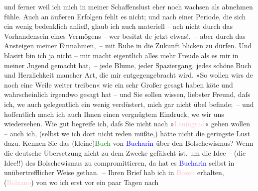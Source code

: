                und ferner weil ich mich in meiner Schaffenslust eher noch wachsen als abnehmen
               fühle. Auch an äußeren Erfolgen fehlt es nicht; und nach einer Periode, die sich ein
               wenig bedenklich anließ, glaub ich auch materiell – ach nicht durch das Vorhandensein
               eines Vermögens – wer besitzt de{\geminationn} jetzt etwas!, – aber
               durch das Ansteigen meiner Einnahmen, – mit Ruhe in die Zukunft blicken zu dürfen.
               Und blasirt bin ich ja nicht – mir macht eigentlich alles mehr Freude als es mir in
               meiner Jugend gemacht hat, – jede Blume, jeder Spaziergang, jedes schöne Buch und
               Herzlichkeit mancher Art, die mir entgegengebracht wird. »So wollen wirs de{\geminationn} noch eine Weile weiter treiben« wie ein sehr Großer
               gesagt haben kö{\geminationn}te und wahrscheinlich irgendwo gesagt
               hat – und Sie sollen wissen, liebster Freund, daſs ich, we{\geminationn} auch gelegentlich ein wenig verdüstert, {\pb}mich gar nicht übel befinde; – und hoffentlich
               mach ich auch Ihnen einen vergnügtem Eindruck, we{\geminationn} wir
               uns wiedersehen.\pend
           \pstart
           Wie gut begreife ich, daſs Sie nicht nach »\textcolor{pink}{Leningrad}{}\ledrightnote{\textcolor{pink}{Sankt Petersburg}}« gehen wollen – auch ich, (selbst we{\geminationn}
               ich dort nicht reden müßte,) hätte nicht die geringste Lust dazu. Kennen Sie das \introOben{}(kleine)\introOben{}{ }\textcolor{green}{Buch}{} von \textcolor{blue}{Bucharin}{}\ledrightnote{\textcolor{blue}{Nikolaj Ivanovič Bucharin}} über den Bolschewismus? Wenn die deutsche Übersetzung
               nicht \label{T_L02444_2v}\label{T_L02444_2h} zu dem Zwecke gefälscht ist, um die Idee – (die
               Idee!!) des Bolschewismus zu compromittieren, da{\geminationn} hat es
                  \textcolor{blue}{Bucharin}{}\ledrightnote{\textcolor{blue}{Nikolaj Ivanovič Bucharin}} selbst in unübertrefflicher Weise
               gethan. –\pend
           \pstart
           Ihren Brief hab ich in \textcolor{pink}{Bozen}{}\ledrightnote{\textcolor{pink}{Bozen}} erhalten, (\textcolor{pink}{Bolzano}{}\ledrightnote{\textcolor{pink}{Bozen}}) von wo ich erst vor ein paar Tagen nach
